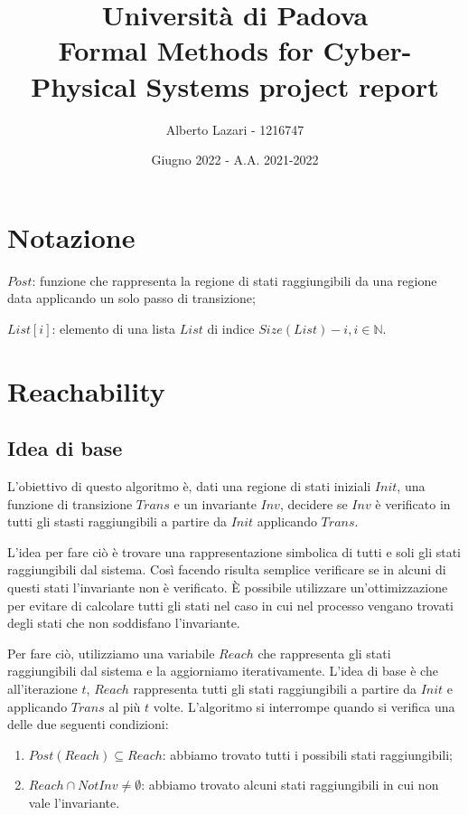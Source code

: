 \documentclass[12pt]{article}
\title{\textbf{Università di Padova \\ Formal Methods for Cyber-Physical Systems project report}}
\author{Alberto Lazari - 1216747 \\}
\date{Giugno 2022 - A.A. 2021-2022}
\begin{document}
    \maketitle
    \pagebreak

    \tableofcontents
    \pagebreak

    \section{Notazione}
    \begin{description}
        \item $Post$: funzione che rappresenta la regione di stati raggiungibili da una regione data applicando un solo passo di transizione;
        \item $List[i]$: elemento di una lista $List$ di indice $Size(List) - i, i \in \mathbb N$.
    \end{description}

    \section{Reachability}
    \subsection{Idea di base}
    L'obiettivo di questo algoritmo è, dati una regione di stati iniziali $Init$, una funzione di transizione $Trans$ e un invariante $Inv$, decidere se $Inv$ è verificato in tutti gli stasti raggiungibili a partire da $Init$ applicando $Trans$.

    L'idea per fare ciò è trovare una rappresentazione simbolica di tutti e soli gli stati raggiungibili dal sistema.
    Così facendo risulta semplice verificare se in alcuni di questi stati l'invariante non è verificato.
    È possibile utilizzare un'ottimizzazione per evitare di calcolare tutti gli stati nel caso in cui nel processo vengano trovati degli stati che non soddisfano l'invariante.

    Per fare ciò, utilizziamo una variabile $Reach$ che rappresenta gli stati raggiungibili dal sistema e la aggiorniamo iterativamente.
    L'idea di base è che all'iterazione $t$, $Reach$ rappresenta tutti gli stati raggiungibili a partire da $Init$ e applicando $Trans$ al più $t$ volte.
    L'algoritmo si interrompe quando si verifica una delle due seguenti condizioni:
    \begin{enumerate}
        \item $Post(Reach) \subseteq Reach $: abbiamo trovato tutti i possibili stati raggiungibili;
        \item $Reach \cap NotInv \neq \emptyset$: abbiamo trovato alcuni stati raggiungibili in cui non vale l'invariante.
    \end{enumerate}
\end{document}
